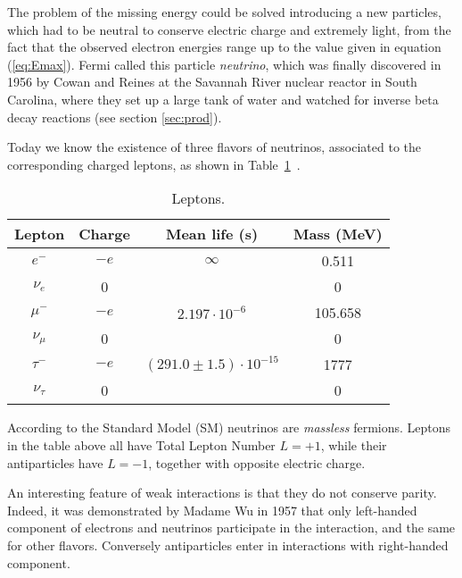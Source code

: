 \documentclass{subnucbo}
\begin{document}
The problem of the missing energy could be solved introducing a new particles, which had to be neutral to conserve electric charge and extremely light, from the fact that the observed electron energies range up to the value given in equation (\ref{eq:Emax}).
Fermi called this particle \emph{neutrino}, which was finally discovered in 1956 by Cowan and Reines at the Savannah River nuclear reactor in South Carolina, where they set up a large tank of water and watched for inverse beta decay reactions (see section \ref{sec:prod}).

Today we know the existence of three flavors of neutrinos, associated to the corresponding charged leptons, as shown in Table~\ref{tab:classification}~\cite{ref:cott}.
\begin{table}[H]
\begin{tabular}{cccc}
\toprule
Lepton & Charge & Mean life (s) & Mass (MeV)\\
\midrule
$e^-$ & $-e$ & $\infty$ & 0.511\\
$\nu_e$ & 0 &  & 0\\
$\mu^-$ & $-e$ & $2.197\cdot10^{-6}$ & 105.658\\
$\nu_\mu$ & 0 & & 0\\
$\tau^-$ & $-e$ & $(291.0\pm1.5)\cdot10^{-15}$ & 1777\\
$\nu_\tau$ & 0 &  & 0\\
\bottomrule
\end{tabular}
\caption{Leptons.}
\label{tab:classification}
\end{table}
 
According to the Standard Model (SM) neutrinos are \emph{massless} fermions. Leptons in the table above all have Total Lepton Number $L=+1$, while their antiparticles have $L=-1$, together with opposite electric charge.

An interesting feature of weak interactions is that they do not conserve parity. Indeed, it was demonstrated by Madame Wu in 1957 that only left-handed component of electrons and neutrinos participate in the interaction, and the same for other flavors. Conversely antiparticles enter in interactions with right-handed component.
\end{document}

